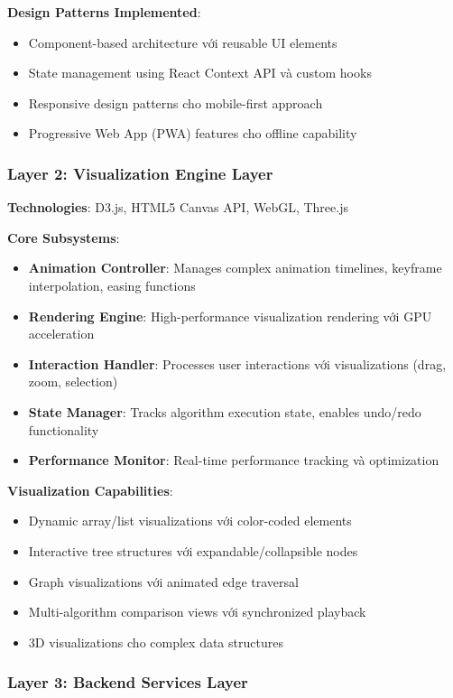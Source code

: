 \textbf{Design Patterns Implemented}:
\begin{itemize}
    \item Component-based architecture với reusable UI elements
    \item State management using React Context API và custom hooks
    \item Responsive design patterns cho mobile-first approach
    \item Progressive Web App (PWA) features cho offline capability
\end{itemize}

\subsubsection{Layer 2: Visualization Engine Layer}

\textbf{Technologies}: D3.js, HTML5 Canvas API, WebGL, Three.js

\textbf{Core Subsystems}:
\begin{itemize}
    \item \textbf{Animation Controller}: Manages complex animation timelines, keyframe interpolation, easing functions
    \item \textbf{Rendering Engine}: High-performance visualization rendering với GPU acceleration
    \item \textbf{Interaction Handler}: Processes user interactions với visualizations (drag, zoom, selection)
    \item \textbf{State Manager}: Tracks algorithm execution state, enables undo/redo functionality
    \item \textbf{Performance Monitor}: Real-time performance tracking và optimization
\end{itemize}

\textbf{Visualization Capabilities}:
\begin{itemize}
    \item Dynamic array/list visualizations với color-coded elements
    \item Interactive tree structures với expandable/collapsible nodes
    \item Graph visualizations với animated edge traversal
    \item Multi-algorithm comparison views với synchronized playback
    \item 3D visualizations cho complex data structures
\end{itemize}

\subsubsection{Layer 3: Backend Services Layer}

